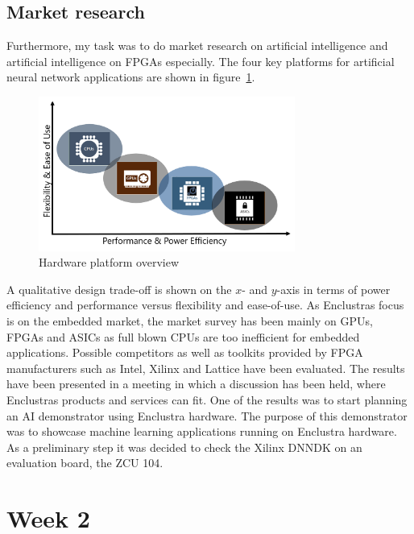 \subsection{Market research}
Furthermore, my task was to do market research on artificial intelligence and artificial intelligence on \acp{FPGA} especially. The four key platforms for artificial neural network applications are shown in figure~\ref{fig:overview}.
\begin{figure}[!htb]
	\centering
		\includegraphics[width=0.75\textwidth]{bilder/overview.png}
		\caption{Hardware platform overview}
		\label{fig:overview}
\end{figure}
A qualitative design trade-off is shown on the $x$- and $y$-axis in terms of power efficiency and performance versus flexibility and ease-of-use. As Enclustras focus is on the embedded market, the market survey has been mainly on \acp{GPU}, \acp{FPGA} and \acp{ASIC} as full blown \acp{CPU} are too inefficient for embedded applications. Possible competitors as well as toolkits provided by \ac{FPGA} manufacturers such as Intel, Xilinx and Lattice have been evaluated. The results have been presented in a meeting in which a discussion has been held, where Enclustras products and services can fit. One of the results was to start planning an \ac{AI} demonstrator using Enclustra hardware. The purpose of this demonstrator was to showcase machine learning applications running on Enclustra hardware. As a preliminary step it was decided to check the Xilinx \ac{DNNDK} on an evaluation board, the ZCU 104.

\section{Week 2}
